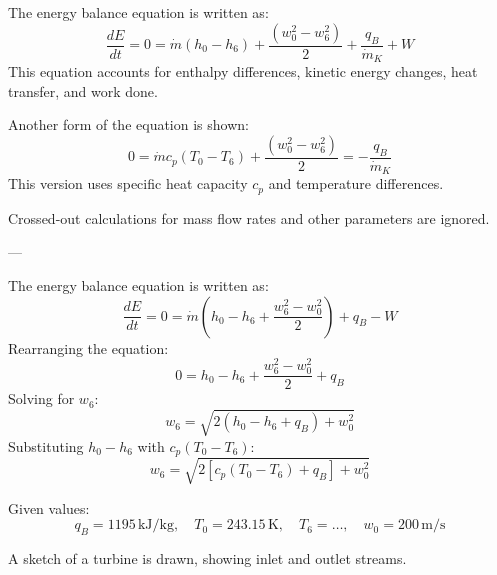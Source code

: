 The energy balance equation is written as:  
\[
\frac{dE}{dt} = 0 = \dot{m} \left( h_0 - h_6 \right) + \frac{\left( w_0^2 - w_6^2 \right)}{2} + \frac{q_{B}}{\dot{m}_K} + W
\]  
This equation accounts for enthalpy differences, kinetic energy changes, heat transfer, and work done.  

Another form of the equation is shown:  
\[
0 = \dot{m} c_p \left( T_0 - T_6 \right) + \frac{\left( w_0^2 - w_6^2 \right)}{2} = -\frac{q_{B}}{\dot{m}_K}
\]  
This version uses specific heat capacity \( c_p \) and temperature differences.  

Crossed-out calculations for mass flow rates and other parameters are ignored.  

---

The energy balance equation is written as:  
\[
\frac{dE}{dt} = 0 = \dot{m} \left( h_0 - h_6 + \frac{w_6^2 - w_0^2}{2} \right) + q_B - W
\]  
Rearranging the equation:  
\[
0 = h_0 - h_6 + \frac{w_6^2 - w_0^2}{2} + q_B
\]  
Solving for \( w_6 \):  
\[
w_6 = \sqrt{2 \left( h_0 - h_6 + q_B \right) + w_0^2}
\]  
Substituting \( h_0 - h_6 \) with \( c_p (T_0 - T_6) \):  
\[
w_6 = \sqrt{2 \left[ c_p (T_0 - T_6) + q_B \right] + w_0^2}
\]  

Given values:  
\[
q_B = 1195 \, \text{kJ/kg}, \quad T_0 = 243.15 \, \text{K}, \quad T_6 = \ldots, \quad w_0 = 200 \, \text{m/s}
\]  

A sketch of a turbine is drawn, showing inlet and outlet streams.